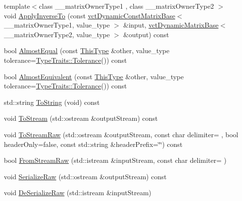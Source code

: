 \begin{DoxyCompactItemize}
\item 
{\footnotesize template$<$class \+\_\+\+\_\+matrix\+Owner\+Type1 , class \+\_\+\+\_\+matrix\+Owner\+Type2 $>$ }\\void \hyperlink{classvct_frame_base_ad86ca94ce86c6e1d25feac5786c1a9c3}{Apply\+Inverse\+To} (const \hyperlink{classvct_dynamic_const_matrix_base}{vct\+Dynamic\+Const\+Matrix\+Base}$<$ \+\_\+\+\_\+matrix\+Owner\+Type1, value\+\_\+type $>$ \&input, \hyperlink{classvct_dynamic_matrix_base}{vct\+Dynamic\+Matrix\+Base}$<$ \+\_\+\+\_\+matrix\+Owner\+Type2, value\+\_\+type $>$ \&output) const 
\item 
bool \hyperlink{classvct_frame_base_af4b4436216fecfaa8f9eba4f57f60d91}{Almost\+Equal} (const \hyperlink{classvct_frame_base_a076f1fe4fc957faa0d1ff7450d1cb768}{This\+Type} \&other, value\+\_\+type tolerance=\hyperlink{classcmn_type_traits_adc129bf9867295b90d300768b780fa99}{Type\+Traits\+::\+Tolerance}()) const 
\item 
bool \hyperlink{classvct_frame_base_a7e7820a32c408471a3d773005a4ed1ab}{Almost\+Equivalent} (const \hyperlink{classvct_frame_base_a076f1fe4fc957faa0d1ff7450d1cb768}{This\+Type} \&other, value\+\_\+type tolerance=\hyperlink{classcmn_type_traits_adc129bf9867295b90d300768b780fa99}{Type\+Traits\+::\+Tolerance}()) const 
\item 
std\+::string \hyperlink{classvct_frame_base_a19b8c4c53cf3c2f2f21fdff389bf17ee}{To\+String} (void) const 
\item 
void \hyperlink{classvct_frame_base_a1cf756ad3b4298e57742abe29b042ae1}{To\+Stream} (std\+::ostream \&output\+Stream) const 
\item 
void \hyperlink{classvct_frame_base_a1c200125979ce9aa7328950177fdd38e}{To\+Stream\+Raw} (std\+::ostream \&output\+Stream, const char delimiter= \textquotesingle{} \textquotesingle{}, bool header\+Only=false, const std\+::string \&header\+Prefix=\char`\"{}\char`\"{}) const 
\item 
bool \hyperlink{classvct_frame_base_ab1611f1a1f24865301ed44c1f2ec315b}{From\+Stream\+Raw} (std\+::istream \&input\+Stream, const char delimiter= \textquotesingle{} \textquotesingle{})
\item 
void \hyperlink{classvct_frame_base_a52850a6beccb4d50e6d63cc2e222910a}{Serialize\+Raw} (std\+::ostream \&output\+Stream) const 
\item 
void \hyperlink{classvct_frame_base_af9dd60e9c4058e335b480e39cf8c899b}{De\+Serialize\+Raw} (std\+::istream \&input\+Stream)
\end{DoxyCompactItemize}
{\bf }\par
